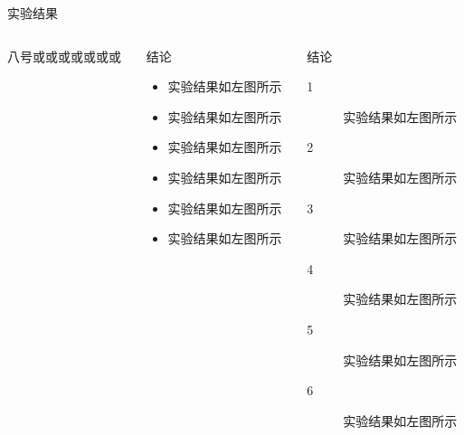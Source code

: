 \documentclass[8pt,compress,t,noamsthm,notheorem,handout,table]{beamer}
\theoremstyle{nonumberplain}%
\theoremstyle{plain}
\begin{document}
\begin{frame}{实验结果}
\begin{columns}[T]%
	\begin{column}{0.30\textwidth}
		八号或或或或或或或
	\end{column}
	\begin{column}{0.30\textwidth}
		\begin{Block}{结论}
			\begin{itemize}
				\item 实验结果如左图所示
				\item 实验结果如左图所示
				\item 实验结果如左图所示
				\item 实验结果如左图所示
				\item 实验结果如左图所示
				\item 实验结果如左图所示
			\end{itemize}
		\end{Block}
	\end{column}

	\begin{column}{0.30\textwidth}
		\begin{block}{结论}
			\begin{description}
				\item[1] 实验结果如左图所示
				\item[2] 实验结果如左图所示
				\item[3] 实验结果如左图所示
				\item[4] 实验结果如左图所示
				\item[5] 实验结果如左图所示
				\item[6] 实验结果如左图所示
			\end{description}
		\end{block}
	\end{column}
\end{columns}
\end{frame}
\end{document}
